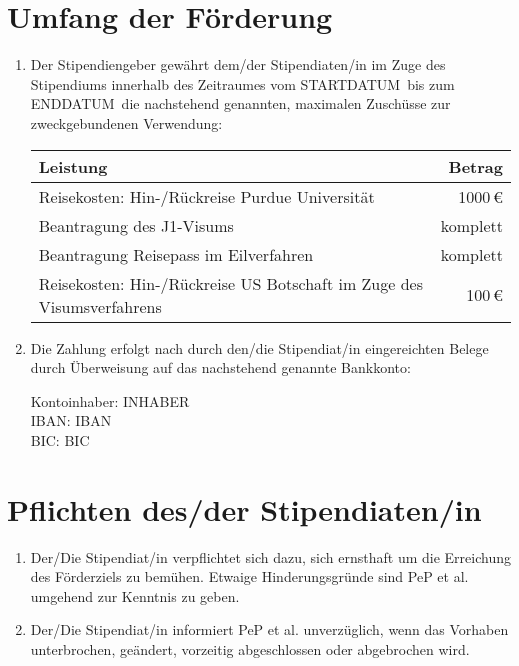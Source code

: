 \documentclass[
  paper=a4,
  fontsize=12pt,
  DIV=16,
  parskip=full,
  headinclude=true,
]{scrartcl}
\newcommand\stipstart{STARTDATUM} %
\newcommand\stipende{ENDDATUM}    %
\newcommand\stipkontoinhaber{INHABER}    %
\newcommand\stipbic{BIC}          %
\newcommand\stipiban{IBAN}
\begin{document}
\section{Umfang der Förderung}

\begin{enumerate}[\qquad(1)]
  \item Der Stipendiengeber gewährt dem/der Stipendiaten/in im Zuge des
    Stipendiums innerhalb des Zeitraumes vom \stipstart\ bis zum \stipende\
    die nachstehend genannten, maximalen Zuschüsse zur zweckgebundenen Verwendung:

    \begin{tabular}{l r}
      \toprule
      Leistung & Betrag \\
      \midrule
      Reisekosten: Hin-/Rückreise Purdue Universität & \num{1000}\,€ \\
      Beantragung des J1-Visums & komplett \\
      Beantragung Reisepass im Eilverfahren & komplett \\
      Reisekosten: Hin-/Rückreise US Botschaft im Zuge des Visumsverfahrens &
        \num{100}\,€ \\
      \bottomrule
    \end{tabular}
  \item Die Zahlung erfolgt nach durch den/die Stipendiat/in eingereichten
    Belege durch Überweisung auf das nachstehend genannte Bankkonto:

    Kontoinhaber: \stipkontoinhaber \\
    IBAN: \stipiban \\
    BIC: \stipbic
\end{enumerate}

\section{Pflichten des/der Stipendiaten/in}

\begin{enumerate}[\qquad(1)]
  \item Der/Die Stipendiat/in verpflichtet sich dazu, sich ernsthaft um die
    Erreichung des Förderziels zu bemühen. Etwaige Hinderungsgründe sind
    PeP et al. umgehend zur Kenntnis zu geben.
  \item Der/Die Stipendiat/in informiert PeP et al. unverzüglich, wenn das
    Vorhaben unterbrochen, geändert, vorzeitig abgeschlossen oder
    abgebrochen wird.
\end{enumerate}
\end{document}
